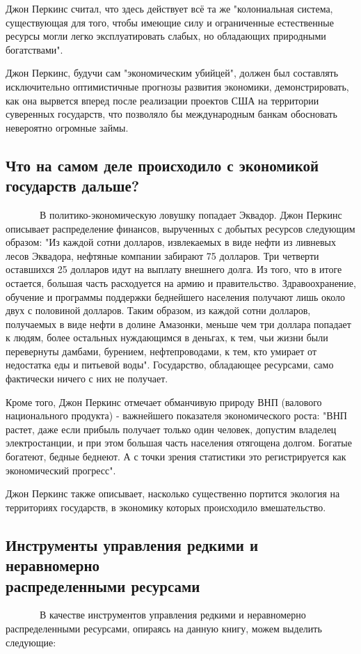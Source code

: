 \documentclass[12pt]{article}
\begin{document}
Джон Перкинс считал, что здесь действует всё та же "колониальная система, существующая для того, чтобы имеющие силу и ограниченные естественные ресурсы могли легко эксплуатировать слабых, но обладающих природными богатствами".

Джон Перкинс, будучи сам "экономическим убийцей", должен был составлять исключительно оптимистичные прогнозы развития экономики, демонстрировать, как она вырвется вперед после реализации проектов США на территории суверенных государств, что позволяло бы международным банкам обосновать невероятно огромные займы.

\subsection{Что на самом деле происходило с экономикой государств дальше?}
\ \ \ \ \ \ \ В политико-экономическую ловушку попадает Эквадор. Джон Перкинс описывает распределение финансов, вырученных с добытых ресурсов следующим образом: "Из каждой сотни долларов, извлекаемых в виде нефти из ливневых лесов Эквадора, нефтяные компании забирают 75 долларов. Три четверти оставшихся 25 долларов идут на выплату внешнего долга. Из того, что в итоге остается, большая часть расходуется на армию и правительство. Здравоохранение, обучение и программы поддержки беднейшего населения получают лишь около двух с половиной
долларов. Таким образом, из каждой сотни долларов, получаемых в виде нефти в долине Амазонки, меньше чем три доллара попадает к людям, более остальных нуждающимся в деньгах, к тем, чьи жизни были перевернуты дамбами, бурением, нефтепроводами, к тем, кто умирает от недостатка еды и питьевой воды". Государство, обладающее ресурсами, само фактически ничего с них не получает.

Кроме того, Джон Перкинс отмечает обманчивую природу ВНП (валового национального продукта) - важнейшего показателя экономического роста: "ВНП растет, даже если прибыль получает только один человек, допустим владелец электростанции, и при этом большая часть населения отягощена долгом. Богатые богатеют, бедные беднеют. А с точки зрения статистики это регистрируется как экономический прогресс".

Джон Перкинс также описывает, насколько существенно портится экология на территориях государств, в экономику которых происходило вмешательство.

\subsection{Инструменты управления редкими и неравномерно \\распределенными ресурсами}
\ \ \ \ \ \ \ В качестве инструментов управления редкими и неравномерно распределенными ресурсами, опираясь на данную книгу, можем выделить следующие:
\end{document}
